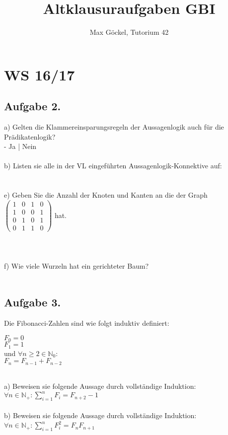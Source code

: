 \documentclass[11pt]{article} %
\title{Altklausuraufgaben GBI}
\author{Max Göckel, Tutorium 42}
\date{} %
\begin{document}
\maketitle

\section{WS 16/17}



\subsection{Aufgabe 2.}
a) Gelten die Klammereinsparungsregeln der Aussagenlogik auch für die Prädikatenlogik? \\
- \quad Ja \quad | \quad Nein \\
\ \\
b) Listen sie alle in der VL eingeführten  Aussagenlogik-Konnektive auf:\\
\ \\
\ \\
e) Geben Sie die Anzahl der Knoten und Kanten an die der Graph
$
\begin{pmatrix}
1 & 0 & 1 & 0 \\
1 & 0 & 0 & 1 \\
0 & 1 & 0 & 1 \\
0 & 1 & 1 & 0
\end{pmatrix}
$ hat.\\
\ \\
\ \\
\ \\
f) Wie viele Wurzeln hat ein gerichteter Baum?
\ \\
\ \\
\subsection{Aufgabe 3.}
Die Fibonacci-Zahlen sind wie folgt induktiv definiert:\\
\begin{center}
$F_0 = 0$ \\
$F_1 = 1$ \\
und $\forall n \geq 2 \in \mathbb{N}_0: $ \\
$F_n = F_{n-1} + F_{n-2}$
\end{center}
\ \\
a) Beweisen sie folgende Aussage durch vollständige Induktion: \\
$\forall n \in \mathbb{N}_+: \sum_{i=1}^n F_i = F_{n+2} - 1$ \\
\ \\
b) Beweisen sie folgende Aussage durch vollständige Induktion: \\
$\forall n \in \mathbb{N}_+: \sum_{i=1}^n F_{i}^2 = F_n F_{n+1}$
\ \\
\ \\
\end{document}
